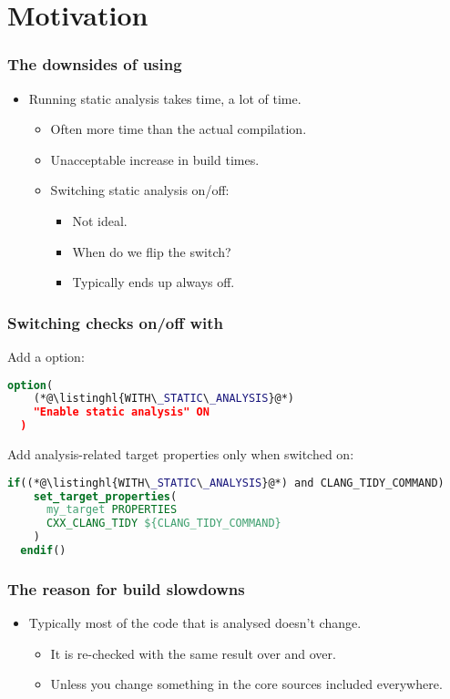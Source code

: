 \documentclass[compress,table,xcolor=table]{beamer}
\begin{document}
\section{Motivation}
\begin{frame}
  \frametitle{The downsides of using }
    \LARGE
    \begin{itemize}
    \item Running static analysis takes time, {\larger a lot} of time.
        \Large
        \begin{itemize}
        \item Often more time than the actual compilation.
        \item Unacceptable increase in build times.
        \item Switching static analysis on/off:
            \begin{itemize}
            \item Not ideal.
            \item When do we flip the switch?
            \item Typically ends up always off.
            \end{itemize}
        \end{itemize}
    \end{itemize}
\end{frame}
\begin{frame}[fragile]
  \frametitle{Switching  checks on/off with }
  \Large
   Add a  option:
  \begin{lstlisting}[language=cmake]
  option(
    (*@\listinghl{WITH\_STATIC\_ANALYSIS}@*)
    "Enable static analysis" ON
  )
  \end{lstlisting}

  Add analysis-related target properties only when switched on:

  \begin{lstlisting}[language=cmake]
  if((*@\listinghl{WITH\_STATIC\_ANALYSIS}@*) and CLANG_TIDY_COMMAND)
    set_target_properties(
      my_target PROPERTIES
      CXX_CLANG_TIDY ${CLANG_TIDY_COMMAND}
    )
  endif()
  \end{lstlisting}

\end{frame}
\begin{frame}
  \frametitle{The reason for build slowdowns}
    \LARGE
    \begin{itemize}
    \item Typically most of the code that is analysed doesn't change.
        \begin{itemize}
        \Large
        \item It is re-checked with the same result over and over.
        \item Unless you change something in the core sources included
            everywhere.
        \end{itemize}
    \end{itemize}
\end{frame}
\end{document}
